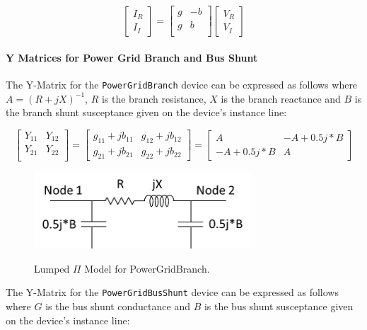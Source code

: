 \begin{equation}
  \left[ \begin{array}{c} I_{R} \\ I_{I}
         \end{array} \right] =
  \left[ \begin{array}{cc} 
         g & -b \\ g & b \\  
         \end{array} \right] 
  \left[ \begin{array}{c} V_{R} \\ V_{I}
          \end{array} \right]
\end{equation}

\paragraph{Y Matrices for Power Grid Branch and Bus Shunt}
The Y-Matrix for the \texttt{PowerGridBranch} device can be expressed as follows where $A=(R+jX)^{-1}$,
$R$ is the branch resistance, $X$ is the branch reactance and $B$ is the branch shunt susceptance given
on the device's instance line:

\begin{equation}
  \left[ \begin{array}{cc} 
         Y_{11} & Y_{12} \\ Y_{21} & Y_{22} \\  
         \end{array} \right] =
  \left[ \begin{array}{cc} 
         g_{11}+jb_{11} & g_{12}+jb_{12} \\  g_{21}+jb_{21} & g_{22}+jb_{22}
         \end{array} \right] =
  \left[ \begin{array}{cc} 
         A & -A+0.5j*B \\ -A+0.5j*B & A
         \end{array} \right]
\end{equation}
\begin{figure}[ht]
  \centering
  \scalebox{1.0}
  {\includegraphics[width=3.2in,height= 1.14in]{PowerGridBranch.jpg}}
  \caption[Lumped $\Pi$ Model for PowerGridBranch]{Lumped $\Pi$ Model for PowerGridBranch. \label{figPowerGridBranch}}
\end{figure}
The Y-Matrix for the \texttt{PowerGridBusShunt} device can be expressed as follows where 
$G$ is the bus shunt conductance and $B$ is the bus shunt susceptance given
on the device's instance line:

